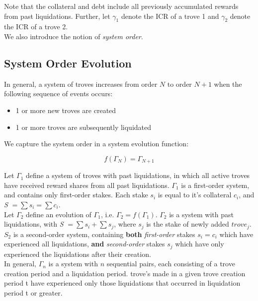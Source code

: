 \documentclass[reqno]{article}
\begin{document}
Note that the collateral and debt include all previously accumulated rewards from past liquidations. Further, let $\gamma_1$ denote the ICR of a trove 1 and $\gamma_2$ denote the ICR of a trove 2. \\


We also introduce the notion of \textit{system order}. 

\subsection{System Order Evolution}
In general, a system of troves increases from order $N$ to order $N+1$ when the following sequence of events occurs:

\begin{itemize}
  \item 1 or more new troves are created 
  \item 1 or more troves are subsequently liquidated
\end{itemize}

We capture the system order in a system evolution function:

\begin{equation} 
    f(\Gamma_N)=\Gamma_{N+1}
\end{equation}

\bigskip
Let $\Gamma_1$ define a system of troves with past liquidations, in which all active troves have received reward shares from all past liquidations. $\Gamma_1$ is a first-order system, and contains only first-order stakes. Each stake $s_i$ is equal to it’s collateral $c_i$, and \textit{S} $= \sum s_i = \sum c_i$.\\

Let $\Gamma_2$ define an evolution of $\Gamma_1$, i.e. $\Gamma_2 = f(\Gamma_1)$. $\Gamma_2$ is a system with past liquidations, with \textit{S} $= \sum s_i + \sum s_j$, where $s_j$ is the stake of newly added $trove_j$. $S_2$ is a second-order system, containing \textbf{both} \textit{first-order} stakes $s_i = c_i$ which have experienced all liquidations, \textbf{and} \textit{second-order} stakes $s_j$ which have only experienced the liquidations after their creation.\\

In general, $\Gamma_n$ is a system with $n$ sequential pairs, each consisting of a trove creation period and a liquidation period. trove's made in a given trove creation period t have experienced only those liquidations that occurred in liquidation period t or greater.
\end{document}
